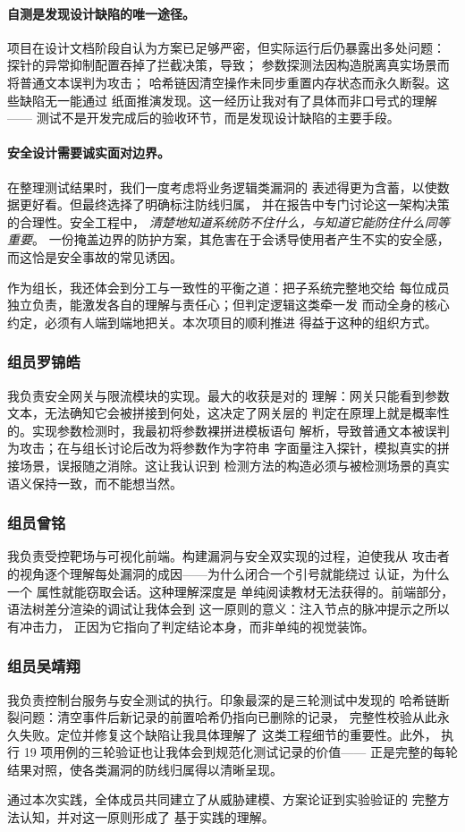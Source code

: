 \paragraph{自测是发现设计缺陷的唯一途径。}
项目在设计文档阶段自认为方案已足够严密，但实际运行后仍暴露出多处问题：
探针的异常抑制配置吞掉了拦截决策，导致；
参数探测法因构造脱离真实场景而将普通文本误判为攻击；
哈希链因清空操作未同步重置内存状态而永久断裂。这些缺陷无一能通过
纸面推演发现。这一经历让我对有了具体而非口号式的理解——
测试不是开发完成后的验收环节，而是发现设计缺陷的主要手段。

\paragraph{安全设计需要诚实面对边界。}
在整理测试结果时，我们一度考虑将业务逻辑类漏洞的
表述得更为含蓄，以使数据更好看。但最终选择了明确标注防线归属，
并在报告中专门讨论这一架构决策的合理性。安全工程中，
\emph{清楚地知道系统防不住什么，与知道它能防住什么同等重要}。
一份掩盖边界的防护方案，其危害在于会诱导使用者产生不实的安全感，
而这恰是安全事故的常见诱因。

作为组长，我还体会到分工与一致性的平衡之道：把子系统完整地交给
每位成员独立负责，能激发各自的理解与责任心；但判定逻辑这类牵一发
而动全身的核心约定，必须有人端到端地把关。本次项目的顺利推进
得益于这种的组织方式。

\subsubsection{组员\quad 罗锦皓}

我负责安全网关与限流模块的实现。最大的收获是对的
理解：网关只能看到参数文本，无法确知它会被拼接到何处，这决定了网关层的
判定在原理上就是概率性的。实现参数检测时，我最初将参数裸拼进模板语句
解析，导致普通文本被误判为攻击；在与组长讨论后改为将参数作为字符串
字面量注入探针，模拟真实的拼接场景，误报随之消除。这让我认识到
检测方法的构造必须与被检测场景的真实语义保持一致，而不能想当然。

\subsubsection{组员\quad 曾铭}

我负责受控靶场与可视化前端。构建漏洞与安全双实现的过程，迫使我从
攻击者的视角逐个理解每处漏洞的成因——为什么闭合一个引号就能绕过
认证，为什么一个  属性就能窃取会话。这种理解深度是
单纯阅读教材无法获得的。前端部分，语法树差分渲染的调试让我体会到
这一原则的意义：注入节点的脉冲提示之所以有冲击力，
正因为它指向了判定结论本身，而非单纯的视觉装饰。

\subsubsection{组员\quad 吴靖翔}

我负责控制台服务与安全测试的执行。印象最深的是三轮测试中发现的
哈希链断裂问题：清空事件后新记录的前置哈希仍指向已删除的记录，
完整性校验从此永久失败。定位并修复这个缺陷让我具体理解了
这类工程细节的重要性。此外，
执行 19 项用例的三轮验证也让我体会到规范化测试记录的价值——
正是完整的每轮结果对照，使各类漏洞的防线归属得以清晰呈现。

通过本次实践，全体成员共同建立了从威胁建模、方案论证到实验验证的
完整方法认知，并对这一原则形成了
基于实践的理解。

